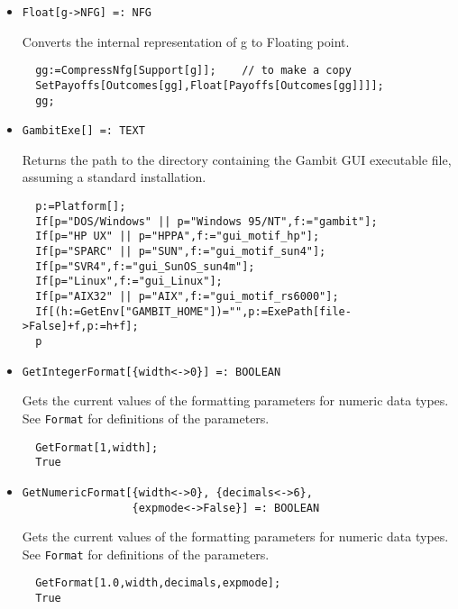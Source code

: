 \begin{itemize}
\item{}
\protect \large \begin{verbatim}
Float[g->NFG] =: NFG 
\end{verbatim}\normalsize

\bd 
Converts the internal representation of g to Floating point.  
\begin{verbatim}
  gg:=CompressNfg[Support[g]];    // to make a copy
  SetPayoffs[Outcomes[gg],Float[Payoffs[Outcomes[gg]]]];
  gg;
\end{verbatim} 
\ed


\item{}
\protect \large \begin{verbatim}
GambitExe[] =: TEXT 
\end{verbatim}\normalsize

\bd 
Returns the path to the directory containing the Gambit GUI executable
file, assuming a standard installation.  
\begin{verbatim}
  p:=Platform[];
  If[p="DOS/Windows" || p="Windows 95/NT",f:="gambit"];
  If[p="HP UX" || p="HPPA",f:="gui_motif_hp"];
  If[p="SPARC" || p="SUN",f:="gui_motif_sun4"];
  If[p="SVR4",f:="gui_SunOS_sun4m"];
  If[p="Linux",f:="gui_Linux"];
  If[p="AIX32" || p="AIX",f:="gui_motif_rs6000"];
  If[(h:=GetEnv["GAMBIT_HOME"])="",p:=ExePath[file->False]+f,p:=h+f];
  p
\end{verbatim} 
\ed

\item{}
\protect \large \begin{verbatim}
GetIntegerFormat[{width<->0}] =: BOOLEAN 
\end{verbatim} \normalsize

\bd 
Gets the current values of the formatting parameters for numeric
data types.  See \verb+Format+ for definitions of the
parameters.  
\begin{verbatim}
  GetFormat[1,width];
  True
\end{verbatim} 
\ed

\item{}
\protect \large \begin{verbatim}
GetNumericFormat[{width<->0}, {decimals<->6}, 
                 {expmode<->False}] =: BOOLEAN 
\end{verbatim} \normalsize

\bd 
Gets the current values of the formatting parameters for numeric
data types.  See \verb+Format+ for definitions of the
parameters.  
\begin{verbatim}
  GetFormat[1.0,width,decimals,expmode];
  True
\end{verbatim} 
\ed


\end{itemize}
